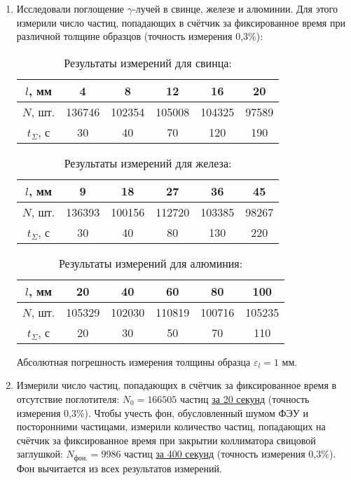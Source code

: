 \documentclass[letterpaper,12pt]{article}
\begin{document}
	\begin{enumerate}
		\item 
	
	
	Исследовали поглощение $\gamma$-лучей в свинце, железе и алюминии. Для этого измерили число частиц, попадающих в счётчик за фиксированное время  при различной толщине образцов (точность измерения 0,3\%):  
		
			\begin{table}[h!]
				\caption{Результаты измерений для свинца:}
				\hspace{3.5cm}
				\begin{tabular}{|c||c|c|c|c|c|}
					\hline
					$l$, мм & 4 & 8 & 12 & 16 & 20 \\ \hline
					$N$, шт. & 136746 & 102354 & 105008 & 104325 & 97589  \\ \hline
					 $t_\Sigma$, с & 30 & 40 & 70 & 120 & 190 \\ \hline
				\end{tabular}
			\end{table}
		
		
			\begin{table}[h!]
				\caption{Результаты измерений для железа:}
				\hspace{3.5cm}
				\begin{tabular}{|c||c|c|c|c|c|}
					\hline
					$l$, мм & 9 & 18 & 27 & 36 & 45 \\ \hline
					$N$, шт. & 136393 & 100156 & 112720 & 103385 & 98267 \\ \hline
					$t_\Sigma$, с & 30 & 40 & 80 & 130 & 220 \\ \hline
				\end{tabular}
			\end{table}
		
		\begin{table}[h!]
			\caption{Результаты измерений для алюминия:}
			\hspace{3.5cm}
			\begin{tabular}{|c||c|c|c|c|c|}
				\hline
				$l$, мм & 20 & 40 & 60 & 80 & 100 \\ \hline
				$N$, шт. & 105329 & 102030 & 110819 & 100716 & 105235 \\ \hline
				$t_\Sigma$, с & 20 & 30 & 50 & 70 & 110 \\ \hline
			\end{tabular}
		\end{table}
		
		Абсолютная погрешность измерения толщины образца $\varepsilon_l=1$ мм.
		\item 
		
		Измерили число частиц, попадающих в счётчик за фиксированное время в отсутствие поглотителя: \underline{$N_0=166505$} частиц \underline{за 20 секунд} (точность измерения 0,3\%). Чтобы учесть фон, обусловленный шумом ФЭУ и посторонними частицами, измерили количество частиц, попадающих на счётчик за фиксированное время при закрытии коллиматора свицовой заглушкой: \underline{$N_\text{фон.}=9986$} частиц \underline{за 400 секунд} (точность измерения 0,3\%).
		Фон вычитается из всех результатов измерений.
		
		
	\end{enumerate}
		\pagebreak
\end{document}
